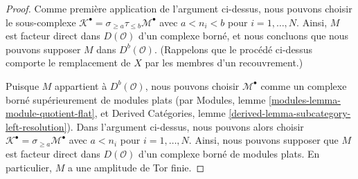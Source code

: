 \begin{proof}
\medskip\noindent
Comme première application de l'argument ci-dessus, nous pouvons choisir le
sous-complexe
$\mathcal{K}^\bullet = \sigma_{\geq a} \tau_{\leq b}\mathcal{M}^\bullet$
avec $a < n_i < b$ pour $i = 1, \ldots, N$. Ainsi, $M$ est facteur direct
dans $D(\mathcal{O})$ d'un complexe borné, et nous concluons que nous pouvons
supposer $M$ dans $D^b(\mathcal{O})$. (Rappelons que le procédé ci-dessus
comporte le remplacement de $X$ par les membres d'un recouvrement.)

\medskip\noindent
Puisque $M$ appartient à $D^b(\mathcal{O})$, nous pouvons choisir
$\mathcal{M}^\bullet$ comme un complexe borné supérieurement de modules plats
(par Modules, lemme \ref{modules-lemma-module-quotient-flat}, et Derived
Catégories, lemme \ref{derived-lemma-subcategory-left-resolution}). Dans
l'argument ci-dessus, nous pouvons alors choisir
$\mathcal{K}^\bullet = \sigma_{\geq a}\mathcal{M}^\bullet$ avec $a < n_i$
pour $i = 1, \ldots, N$. Ainsi, nous pouvons supposer que $M$ est facteur
direct dans $D(\mathcal{O})$ d'un complexe borné de modules plats. En
particulier, $M$ a une amplitude de Tor finie.


\end{proof}
